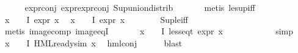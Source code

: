 \begin{isabellebody}
\ \ \ \ \isamarkupfalse%
\ expr{\isacharunderscore}{\kern0pt}{}{\isacharunderscore}{\kern0pt}conj\ expr{\isacharunderscore}{\kern0pt}{}{\isachardot}{\kern0pt}expr{\isacharunderscore}{\kern0pt}{}{\isacharunderscore}{\kern0pt}conj\ Sup{\isacharunderscore}{\kern0pt}union{\isacharunderscore}{\kern0pt}distrib\ \isanewline
\ \ \ \ \isamarkupfalse%
\ {\isacharparenleft}{\kern0pt}metis\ le{\isacharunderscore}{\kern0pt}sup{\isacharunderscore}{\kern0pt}iff{\isacharparenright}{\kern0pt}{\isacharplus}{\kern0pt}\isanewline
\ \ \isamarkupfalse%
\ {\isachardoublequoteopen}{\isasymforall}x\ {\isasymin}\ {\isasymPhi}\ {\isacharbackquote}{\kern0pt}\ I{\isachardot}{\kern0pt}\ expr{\isacharunderscore}{\kern0pt}{}\ x\ {\isasymle}\ {}{\isachardoublequoteclose}\isanewline
{\isachardoublequoteopen}{\isasymforall}x\ {\isasymin}\ {\isasymPhi}\ {\isacharbackquote}{\kern0pt}\ I{\isachardot}{\kern0pt}\ expr{\isacharunderscore}{\kern0pt}{}\ x\ {\isasymle}\ {}{\isachardoublequoteclose}\isanewline
\ \ \ \ \isamarkupfalse%
\ Sup{\isacharunderscore}{\kern0pt}le{\isacharunderscore}{\kern0pt}iff\isanewline
\ \ \ \ \isamarkupfalse%
\ {\isacharparenleft}{\kern0pt}metis\ image{\isacharunderscore}{\kern0pt}comp\ image{\isacharunderscore}{\kern0pt}eqI{\isacharparenright}{\kern0pt}{\isacharplus}{\kern0pt}\ \ \ \isanewline
\ \ \isamarkupfalse%
\ {\isachardoublequoteopen}{\isasymforall}x\ {\isasymin}\ {\isasymPhi}\ {\isacharbackquote}{\kern0pt}\ I{\isachardot}{\kern0pt}\ less{\isacharunderscore}{\kern0pt}eq{\isacharunderscore}{\kern0pt}t\ {\isacharparenleft}{\kern0pt}expr\ x{\isacharparenright}{\kern0pt}\ {\isacharparenleft}{\kern0pt}{\isasyminfinity}{\isacharcomma}{\kern0pt}\ {\isasyminfinity}{\isacharcomma}{\kern0pt}\ {\isasyminfinity}{\isacharcomma}{\kern0pt}\ {\isasyminfinity}{\isacharcomma}{\kern0pt}\ {}{\isacharcomma}{\kern0pt}\ {}{\isacharparenright}{\kern0pt}{\isachardoublequoteclose}\isanewline
\ \ \ \ \isamarkupfalse%
\ simp\isanewline
\ \ \isamarkupfalse%
\ {\isachardoublequoteopen}{\isasymforall}x\ {\isasymin}\ {\isasymPhi}\ {\isacharbackquote}{\kern0pt}\ I{\isachardot}{\kern0pt}\ HML{\isacharunderscore}{\kern0pt}ready{\isacharunderscore}{\kern0pt}sim\ x{\isachardoublequoteclose}\ \isamarkupfalse%
\ hml{\isacharunderscore}{\kern0pt}conj\isanewline
\ \ \ \ \isamarkupfalse%
\ blast\isanewline
\ \ \isamarkupfalse%

\end{isabellebody}

